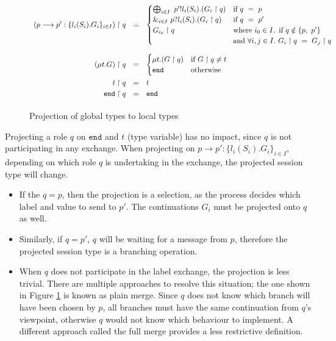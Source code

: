 \documentclass[12pt,twoside]{report}
\begin{document}
\begin{figure}[h]
    \centering
    \begin{equation*}
    \centering
    \begin{array}{rcl}
        
        (p \longrightarrow p':\{l_i(S_i).G_i\}_{i \in I}) \upharpoonright q & = &
        \begin{cases}
            \bigoplus_{i \in I}\ p'!l_i(S_i).(G_i \upharpoonright q) & \text{if}\ q\ =\ p\\
            \&_{i \in I}\ p?l_i(S_i).(G_i \upharpoonright q) & \text{if}\ q\ =\ p'\\
            G_{i_0} \upharpoonright q & \text{where}\ i_0 \in I,\ \text{if}\ q \notin \{p,\ p'\}\\
            & \text{and}\ \forall i,j \in I.\ G_i \upharpoonright q\ =\ G_j \upharpoonright q
        \end{cases}\\[33pt]
        (\mu t.G) \upharpoonright q & = & 
        \begin{cases}
            \mu t.(G \upharpoonright q) & \text{if}\ G \upharpoonright q \neq t\\
            \texttt{end} & \text{otherwise}
        \end{cases}\\[13pt]
        t \upharpoonright q & = & t\\[2.75pt]
        \texttt{end} \upharpoonright q & = & \texttt{end}\\[2.75pt]
        \end{array}
    \end{equation*}
    \caption{Projection of global types to local types}
    \label{MPST_projection}
\end{figure}{}

Projecting a role $q$ on $\texttt{end}$ and $t$ (type variable) has no impact, since $q$ is not participating in any exchange. When projecting on $p \longrightarrow p':\{l_i(S_i).G_i\}_{i \in I}$, depending on which role $q$ is undertaking in the exchange, the projected session type will change. 
\begin{itemize}
    \item If the $q = p$, then the projection is a selection, as the process decides which label and value to send to $p'$. The continuations $G_i$ must be projected onto $q$ as well.
    \item Similarly, if $q = p'$, $q$ will be waiting for a message from $p$, therefore the projected session type is a branching operation. 
    \item  When $q$ does not participate in the label exchange, the projection is less trivial. There are multiple approaches to resolve this situation; the one shown in Figure \ref{MPST_projection} is known as plain merge. Since $q$ does not know which branch will have been chosen by $p$, all branches must have the same continuation from $q$'s viewpoint, otherwise $q$ would not know which behaviour to implement. A different approach called the full merge provides a less restrictive definition\cite{verygentleintrotompst}.
    
\end{itemize}
\end{document}
